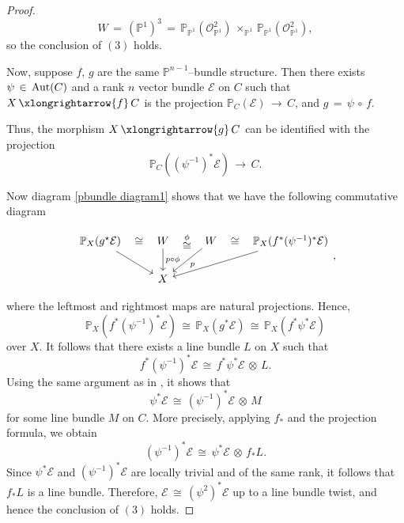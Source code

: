 \documentclass[12pt,reqno]{amsart}
\theoremstyle{definition}
\numberwithin{equation}{section}
\begin{document}
\begin{proof}
$$ W\,=\,(\mathbb{P}^{1})^{3}\,=\, \mathbb{P}_{\mathbb{P}^1}(\mathcal{O}_{\mathbb{P}^1}^{2})\,\times_{\mathbb{P}^1}\, \mathbb{P}_{\mathbb{P}^1}(\mathcal{O}_{\mathbb{P}^1}^{2}),$$ 
so the conclusion of $(3)$ holds. 

Now, suppose $f$, $g$ are the same $ \mathbb{P}^{n-1}$--bundle structure. Then there exists $ \psi\, \in\, \textnormal{Aut}(C)$ and a rank $n$ vector bundle $ \mathcal{E}$ on $C$ such that $ X\, \xlongrightarrow{f}\,C$ is the projection $ \mathbb{P}_{C}(\mathcal{E})\, \longrightarrow\, C$, and $ g\,=\, \psi\, \circ\, f.$ 

Thus, the morphism $ X\, \xlongrightarrow{g}\, C$ can  be identified with the projection 
$$\mathbb{P}_{C}((\psi^{-1})^{\ast}\mathcal{E})\,\longrightarrow\, C.$$ 

Now diagram \ref{pbundle diagram1} shows that we have the following commutative diagram 

\[\begin{tikzcd}
	{\mathbb{P}_{X}(g^\star\mathcal{E})} & W & W & \mathbb{P}_{X}(f^{\ast}(\psi^{-1})^{\ast}\mathcal{E}) \\
	& X
	\arrow[from=1-1, to=2-2]
	\arrow[phantom,"\cong", no head, from=1-1, to=1-2]
	\arrow[phantom,"\overset{\phi}{\cong}", no head, from=1-2, to=1-3]
	\arrow[phantom,"\cong", no head, from=1-3, to=1-4]
	\arrow[ "p \circ \phi",from=1-2, to=2-2]
	\arrow["p", from=1-3, to=2-2]
	\arrow[from=1-4, to=2-2]
\end{tikzcd},\]

where the leftmost and rightmost maps are natural projections. Hence, 
$$ \mathbb{P}_{X}(f^{\ast}(\psi^{-1})^{\ast}\mathcal{E})\, \cong\, \mathbb{P}_{X}(g^{\ast}\mathcal{E})\, \cong\, \mathbb{P}_{X}(f^{\ast} \psi^{\ast}\mathcal{E})$$ 
over $X$. It follows that there exists a line bundle $L$ on $X$ such that 
$$ f^{\ast}(\psi^{-1})^{\ast}\mathcal{E}\, \cong\, f^{\ast} \psi^{\ast}\mathcal{E} \,\otimes\, L.$$ 
Using the same argument as in \cite[ Lemma 3.1]{bansal2023isomorphism}, it shows that 
$$ \psi^{\ast}\mathcal{E}\, \cong\, (\psi^{-1})^{\ast} \mathcal{E}\,\otimes\, M$$ 
for some line bundle $M$ on $C$. More precisely, applying $f_*$ and the projection formula, we obtain  $$(\psi^{-1})^{\ast}\mathcal{E} \,\cong\, \psi^{\ast}\mathcal{E} \,\otimes\, f_{\ast}L.$$ Since $\psi^{\ast}\mathcal{E}$ and $(\psi^{-1})^{\ast}\mathcal{E}$ are locally trivial and of the same rank, it follows that $f_{\ast} L$ is a line bundle.  Therefore, $ \mathcal{E}\,\cong\, (\psi^{2})^{\ast}\mathcal{E}$ up to a line bundle twist, and hence the conclusion of $(3)$ holds.
\end{proof}
\end{document}
